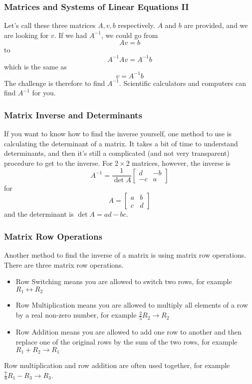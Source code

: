 \documentclass[xcolor=dvipsnames]{beamer}
\begin{document}
\begin{frame}
  \frametitle{Matrices and Systems of Linear Equations II}
Let's call these three matrices $A,v,b$ respectively. $A$ and $b$ are
provided, and we are looking for $v$. If we had $A^{-1}$, we could go
from
\begin{equation}
  \label{eq:baixieda}
  Av=b
\end{equation}
to
\begin{equation}
  \label{eq:maethung}
  A^{-1}Av=A^{-1}b
\end{equation}
which is the same as
\begin{equation}
  \label{eq:leighuga}
  v=A^{-1}b
\end{equation}
The challenge is therefore to find $A^{-1}$. Scientific calculators
and computers can find $A^{-1}$ for you. 
\end{frame}

\begin{frame}
  \frametitle{Matrix Inverse and Determinants}
  If you want to know how to find the inverse yourself, one method to
  use is calculating the determinant of a matrix. It takes a bit of
  time to understand determinants, and then it's still a complicated
  (and not very transparent) procedure to get to the inverse. For
  $2\times{}2$ matrices, however, the inverse is
  \begin{equation}
    \label{eq:iephaizu}
    A^{-1}=\frac{1}{\det{}A}\left[
      \begin{array}{cc}
        d & -b \\
        -c & a
      \end{array}\right]
  \end{equation}
for
  \begin{equation}
    \label{eq:sooxaexa}
    A=\left[
      \begin{array}{cc}
        a & b \\
        c & d
      \end{array}\right]
  \end{equation}
and the determinant is $\det{}A=ad-bc$.
\end{frame}

\begin{frame}
  \frametitle{Matrix Row Operations}
  Another method to find the inverse of a matrix is using
  \alert{matrix row operations}. There are three matrix row
  operations.
\begin{itemize}
\item \alert{Row Switching} means you are allowed to switch two rows,
  for example $R_{1}\leftrightarrow{}R_{2}$
\item \alert{Row Multiplication} means you are allowed to multiply all
  elements of a row by a real non-zero number, for example
  $\frac{2}{5}R_{2}\rightarrow{}R_{2}$
\item \alert{Row Addition} means you are allowed to add one row to
  another and then replace one of the original rows by the sum of the
  two rows, for example $R_{1}+R_{2}\rightarrow{}R_{1}$
\end{itemize}
Row multiplication and row addition are often used together, for
example $\frac{7}{8}R_{1}-R_{3}\rightarrow{}R_{3}$.
\end{frame}
\end{document}
